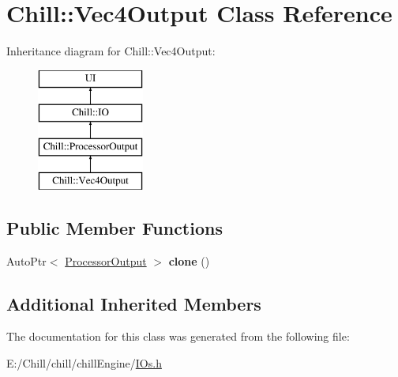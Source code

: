 \hypertarget{class_chill_1_1_vec4_output}{}\section{Chill\+:\+:Vec4\+Output Class Reference}
\label{class_chill_1_1_vec4_output}
Inheritance diagram for Chill\+:\+:Vec4\+Output\+:\begin{figure}[H]
\begin{center}
\leavevmode
\includegraphics[height=4.000000cm]{class_chill_1_1_vec4_output}
\end{center}
\end{figure}
\subsection*{Public Member Functions}
\begin{DoxyCompactItemize}
\item 
\mbox{\label{class_chill_1_1_vec4_output_afd45e3cdb874f7be8660aadfb8bbeb2d}} 
Auto\+Ptr$<$ \mbox{\hyperlink{class_chill_1_1_processor_output}{Processor\+Output}} $>$ {\bfseries clone} ()
\end{DoxyCompactItemize}
\subsection*{Additional Inherited Members}


The documentation for this class was generated from the following file\+:\begin{DoxyCompactItemize}
\item 
E\+:/\+Chill/chill/chill\+Engine/\mbox{\hyperlink{_i_os_8h}{I\+Os.\+h}}\end{DoxyCompactItemize}
